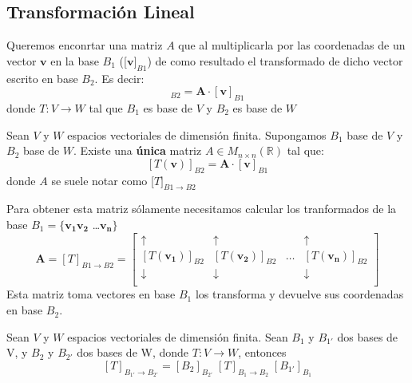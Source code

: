 \subsection{Transformación Lineal}
Queremos enconrtar una matriz $A$ que al multiplicarla por las coordenadas de un
vector $\bm{v}$ en la base $B_1$ ([$\bm{v}]_{B1}$) de como resultado el transformado de
dicho vector escrito en base $B_2$. Es decir:
\begin{equation*}
    [T(\bm{v})]_{B2} = \bm{A} \cdot [\bm{v}]_{B1}
\end{equation*}
donde $T: V \rightarrow W$ tal que $B_1$ es base de $V$ y $B_2$ es base de $W$

\begin{teorema}
    Sean $V$ y $W$ espacios vectoriales de dimensión finita. Supongamos $B_1$
    base de $V$ y $B_2$ base de $W$. Existe una \textbf{única} matriz $A \in M_{n\times n}(\mathbb{R})$ tal que:
    \begin{equation}
        \label{eqn: matrizTransformación}
        [T(\bm{v})]_{B2} = \bm{A} \cdot [\bm{v}]_{B1}
    \end{equation}
    donde $A$ se suele notar como [$T]_{B1\rightarrow B2}$
\end{teorema}
Para obtener esta matriz sólamente necesitamos calcular los tranformados
de la base $B_1 = \{ \bm{v_1} \bm{v_2}$ \dots $\bm{v_n}\}$
\begin{equation}
    \bm{A} = [T]_{B1\rightarrow B2} = 
    \begin{bmatrix}
    \uparrow & \uparrow &  & \uparrow\\
    [T(\bm{v_1})]_{B2} & [T(\bm{v_2})]_{B2} & \dots & [T(\bm{v_n})]_{B2}\\
    \downarrow & \downarrow &  & \downarrow\\
    \end{bmatrix}
\end{equation}
Esta matriz toma vectores en base $B_1$ los transforma y devuelve sus coordenadas
en base $B_2$.\\

\begin{teorema}
    Sean $V$ y $W$ espacios vectoriales de dimensión finita. Sean
    $B_1$ y $B_{1'}$ dos bases de V, y $B_2$ y $B_{2'}$ dos bases 
    de W, donde $T: V \rightarrow W$, entonces
    \begin{equation}
        \label{eqn:camino}
        [T]_{B_{1'} \rightarrow B_{2'}} = [B_2]_{B_{2'}} \;
        [T]_{B_{1} \rightarrow B_{2}} \; [B_{1'}]_{B_1} 
    \end{equation}
\end{teorema}


